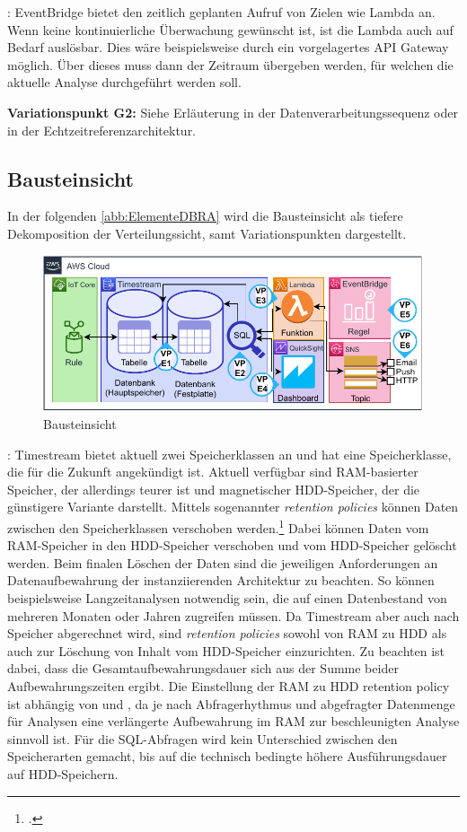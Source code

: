 : EventBridge bietet den zeitlich geplanten Aufruf von Zielen wie Lambda an. Wenn keine kontinuierliche Überwachung gewünscht ist, ist die Lambda auch auf Bedarf auslösbar. Dies wäre beispielsweise durch ein vorgelagertes API Gateway möglich. Über dieses muss dann der Zeitraum übergeben werden, für welchen die aktuelle Analyse durchgeführt werden soll.

\textbf{Variationspunkt G2:} Siehe Erläuterung in der Datenverarbeitungssequenz oder in  der Echtzeitreferenzarchitektur.


\subsection{Bausteinsicht}\label{subsection:Bausteinsich-B}
In der folgenden \autoref{abb:ElementeDBRA} wird die Bausteinsicht als tiefere Dekomposition der Verteilungssicht, samt Variationspunkten dargestellt.
\begin{figure}[H]
\centering
\includegraphics[width=\textwidth]{graphics/DB-RA-Elements.pdf}
\caption{Bausteinsicht}
\label{abb:ElementeDBRA}
\end{figure}

: Timestream bietet aktuell zwei Speicherklassen an und hat eine Speicherklasse, die für die Zukunft angekündigt ist. Aktuell verfügbar sind \ac{RAM}-basierter Speicher, der allerdings teurer ist und magnetischer \ac{HDD}-Speicher, der die günstigere Variante darstellt. Mittels sogenannter \textit{retention policies} können Daten zwischen den Speicherklassen verschoben werden.\footcite[Vgl. auch im Folgenden][]{AmazonWebServicesInc..o.J.bp} Dabei können Daten vom \ac{RAM}-Speicher in den \ac{HDD}-Speicher verschoben und vom \ac{HDD}-Speicher gelöscht werden. Beim finalen Löschen der Daten sind die jeweiligen Anforderungen an Datenaufbewahrung der instanziierenden Architektur zu beachten. So können beispielsweise Langzeitanalysen notwendig sein, die auf einen Datenbestand von mehreren Monaten oder Jahren zugreifen müssen. Da Timestream aber auch nach Speicher abgerechnet wird, sind \textit{retention policies} sowohl von \ac{RAM} zu \ac{HDD} als auch zur Löschung von Inhalt vom \ac{HDD}-Speicher einzurichten. Zu beachten ist dabei, dass die Gesamtaufbewahrungsdauer sich aus der Summe beider Aufbewahrungszeiten ergibt. Die Einstellung der \ac{RAM} zu \ac{HDD} retention policy ist abhängig von  und , da je nach Abfragerhythmus und abgefragter Datenmenge für Analysen eine verlängerte Aufbewahrung im \ac{RAM} zur beschleunigten Analyse sinnvoll ist. Für die \ac{SQL}-Abfragen wird kein Unterschied zwischen den Speicherarten gemacht, bis auf die technisch bedingte höhere Ausführungsdauer auf \ac{HDD}-Speichern.

